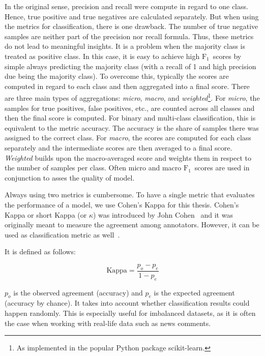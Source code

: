 In the original sense, precision and recall were compute in regard to one class. Hence, true positive and true negatives are calculated separately. But when using the metrics for classification, there is one drawback. The number of true negative samples are neither part of the precision nor recall formula.
Thus, these metrics do not lead to meaningful insights.
It is a problem when the majority class is treated as positive class.
In this case, it is easy to achieve high $\text{F}_{1}$~scores by simple always predicting the majority class (with a recall of 1 and high precision due being the majority class).
To overcome this, typically the scores are computed in regard to each class and then aggregated into a final score. There are three main types of aggregations: \textit{micro}, \textit{macro}, and \textit{weighted}\footnote{As implemented in the popular Python package scikit-learn.}. For \textit{micro}, the samples for true positives, false positives, etc., are counted across all classes and then the final score is computed.
For binary and multi-class classification, this is equivalent to the metric accuracy.
The accuracy is the share of samples there was assigned to the correct class.
For \textit{macro}, the scores are computed for each class separately and the intermediate scores are then averaged to a final score. \textit{Weighted} builds upon the macro-averaged score and weights them in respect to the number of samples per class.
Often micro and macro $\text{F}_{1}$~scores are used in conjunction to asses the quality of model.

Always using two metrics is cumbersome. To have a single metric that evaluates the performance of a model, we use Cohen's Kappa for this thesis.
Cohen's Kappa or short Kappa (or $\kappa$) was introduced by John Cohen~\cite{cohen_kappa_1960} and it was originally meant to measure the agreement among annotators.
However, it can be used as classification metric as well~\cite{ferri2009experimental,witten2005data}.

It is defined as follows:

\begin{equation*}
    \text{Kappa} = \frac{p_o - p_e}{1 - p_e}
\end{equation*}

$p_o$ is the observed agreement (accuracy) and $p_e$ is the expected agreement (accuracy by chance).
It takes into account whether classification results could happen randomly.
This is especially useful for imbalanced datasets, as it is often the case when working with real-life data such as news comments.
